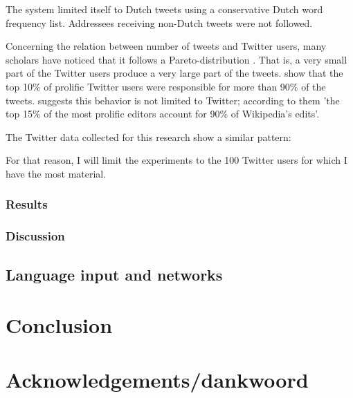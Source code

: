 \documentclass[12pt]{article}
\let\stdsection\section
\renewcommand\section{\newpage\stdsection}
\begin{document}
The system limited itself to Dutch tweets using a conservative Dutch word frequency list. Addressees receiving non-Dutch tweets were not followed.

Concerning the relation between number of tweets and Twitter users, many scholars have noticed that it follows a Pareto-distribution . That is, a very small part of the Twitter users produce a very large part of the tweets.  show that the top 10\% of prolific Twitter users were responsible for more than 90\% of the tweets.  suggests this behavior is not limited to Twitter; according to them 'the top 15\% of the most prolific editors account for 90\% of Wikipedia’s edits'.

The Twitter data collected for this research show a similar pattern:


For that reason, I will limit the experiments to the 100 Twitter users for which I have the most material.

\subsubsection{Results}


\subsubsection{Discussion}


\subsection{Language input and networks}

\section{Conclusion}

\section{Acknowledgements/dankwoord}

{}


\end{document}
